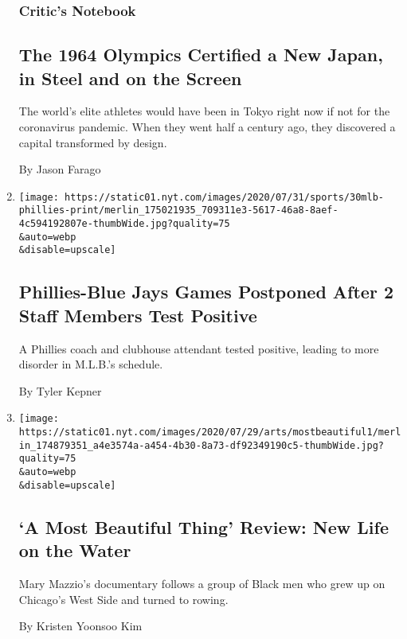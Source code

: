 \begin{enumerate}
{  \subsubsection{Critic's Notebook}\label{critics-notebook}}

  \hypertarget{the-1964-olympics-certified-a-new-japan-in-steel-and-on-the-screen}{%
  \subsection{The 1964 Olympics Certified a New Japan, in Steel and on
  the
  Screen}\label{the-1964-olympics-certified-a-new-japan-in-steel-and-on-the-screen}}

  The world's elite athletes would have been in Tokyo right now if not
  for the coronavirus pandemic. When they went half a century ago, they
  discovered a capital transformed by design.

  By Jason Farago
\item
  \href{/2020/07/30/sports/baseball/phillies-blue-jays-postponed-coronavirus.html}{}

  \texttt{[image: https://static01.nyt.com/images/2020/07/31/sports/30mlb-phillies-print/merlin\_175021935\_709311e3-5617-46a8-8aef-4c594192807e-thumbWide.jpg?quality=75\\\&auto=webp\\\&disable=upscale]}

  \hypertarget{phillies-blue-jays-games-postponed-after-2-staff-members-test-positive}{%
  \subsection{Phillies-Blue Jays Games Postponed After 2 Staff Members
  Test
  Positive}\label{phillies-blue-jays-games-postponed-after-2-staff-members-test-positive}}

  A Phillies coach and clubhouse attendant tested positive, leading to
  more disorder in M.L.B.'s schedule.

  By Tyler Kepner
\item
  \href{/2020/07/30/movies/a-most-beautiful-thing-review.html}{}

  \texttt{[image: https://static01.nyt.com/images/2020/07/29/arts/mostbeautiful1/merlin\_174879351\_a4e3574a-a454-4b30-8a73-df92349190c5-thumbWide.jpg?quality=75\\\&auto=webp\\\&disable=upscale]}

  \hypertarget{a-most-beautiful-thing-review-new-life-on-the-water}{%
  \subsection{`A Most Beautiful Thing' Review: New Life on the
  Water}\label{a-most-beautiful-thing-review-new-life-on-the-water}}

  Mary Mazzio's documentary follows a group of Black men who grew up on
  Chicago's West Side and turned to rowing.

  By Kristen Yoonsoo Kim
\end{enumerate}

